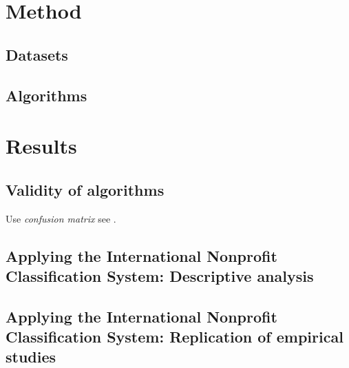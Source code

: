 \documentclass[12pt]{article}
\begin{document}
\section{Method}
\subsection{Datasets}

\subsection{Algorithms}

\section{Results}
\subsection{Validity of algorithms}

Use \textit{confusion matrix} see \textcite[279]{GrimmerTextDataPromise2013}.

\subsection{Applying the International Nonprofit Classification System: Descriptive analysis}

\subsection{Applying the International Nonprofit Classification System: Replication of empirical studies}


\printbibliography
\end{document}
